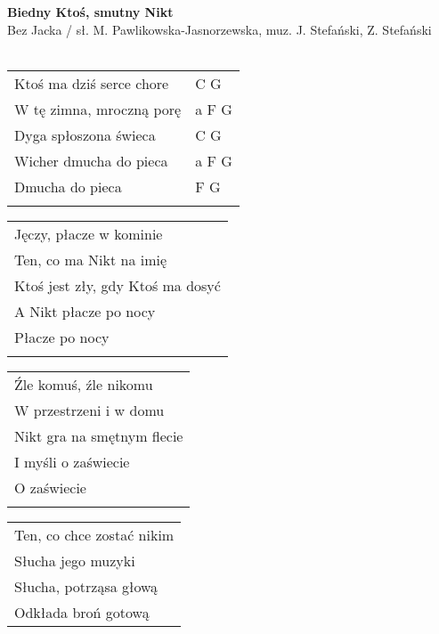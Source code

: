 \documentclass[a5paper]{article}
\begin{document}


\noindent
\fontsize{12pt}{15pt}\selectfont
\textbf{Biedny Ktoś, smutny Nikt} \\
\fontsize{8pt}{10pt}\selectfont
Bez Jacka / sł. M. Pawlikowska-Jasnorzewska, muz. J. Stefański, Z. Stefański \\ \\
\fontsize{10pt}{12pt}\selectfont
{}
\begin{tabular}{@{}p{7cm}p{3cm}@{}}
\noindent
Ktoś ma dziś serce chore & C G \\
W tę zimna, mroczną porę & a F G \\
Dyga spłoszona świeca & C G \\
Wicher dmucha do pieca & a F G \\
Dmucha do pieca & F G \\ \\
\end{tabular}

\noindent
\begin{tabular}{@{}p{9.5cm}@{}}
Jęczy, płacze w kominie \\
Ten, co ma Nikt na imię \\
Ktoś jest zły, gdy Ktoś ma dosyć \\
A Nikt płacze po nocy \\
Płacze po nocy \\ \\
\end{tabular}

\noindent
\begin{tabular}{@{}p{9.5cm}@{}}
Źle komuś, źle nikomu \\
W przestrzeni i w domu \\
Nikt gra na smętnym flecie \\
I myśli o zaświecie \\ 
O zaświecie \\ \\
\end{tabular}

\noindent
\begin{tabular}{@{}p{9.5cm}@{}}
Ten, co chce zostać nikim \\ 
Słucha jego muzyki \\
Słucha, potrząsa głową \\
Odkłada broń gotową
\end{tabular}
\end{document}
